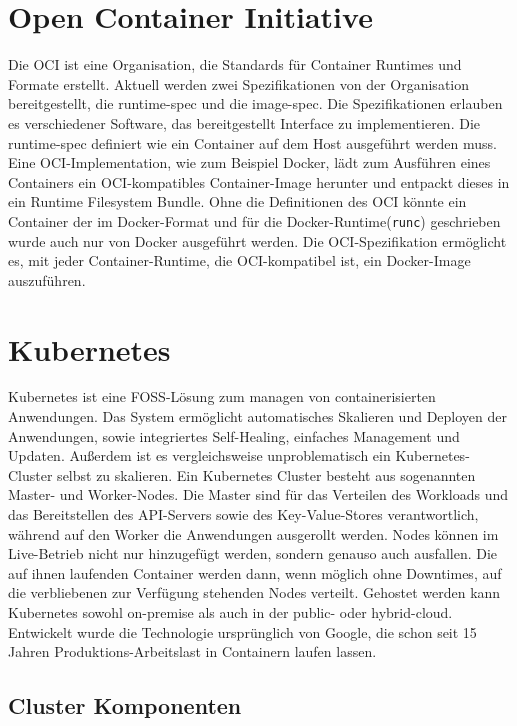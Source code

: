 \section{Open Container Initiative}
Die \ac{OCI} ist eine Organisation, die Standards für Container Runtimes und Formate erstellt.
Aktuell werden zwei Spezifikationen von der Organisation bereitgestellt, die \ac{runtime-spec} und die \ac{image-spec}.
Die Spezifikationen erlauben es verschiedener Software, das bereitgestellt Interface zu implementieren.
Die \ac{runtime-spec} definiert wie ein Container auf dem Host ausgeführt werden muss. 
Eine \ac{OCI}-Implementation, wie zum Beispiel Docker, lädt zum Ausführen eines Containers ein \ac{OCI}-kompatibles Container-Image herunter und entpackt dieses in ein Runtime Filesystem Bundle.
Ohne die Definitionen des \ac{OCI} könnte ein Container der im Docker-Format und für die Docker-Runtime(\texttt{runc}) geschrieben wurde auch nur von Docker ausgeführt werden.
Die \ac{OCI}-Spezifikation ermöglicht es, mit jeder Container-Runtime, die \ac{OCI}-kompatibel ist, ein Docker-Image auszuführen. \cite{oci}



\section{Kubernetes}
Kubernetes ist eine \ac{FOSS}-Lösung zum managen von containerisierten Anwendungen.
Das System ermöglicht automatisches Skalieren und Deployen der Anwendungen, sowie integriertes Self-Healing, einfaches Management und Updaten.
Außerdem ist es vergleichsweise unproblematisch ein Kubernetes-Cluster selbst zu skalieren. 
Ein Kubernetes Cluster besteht aus sogenannten Master- und Worker-Nodes. 
Die Master sind für das Verteilen des Workloads und das Bereitstellen des \ac{API}-Servers sowie des Key-Value-Stores verantwortlich, während auf den Worker die Anwendungen ausgerollt werden. 
Nodes können im Live-Betrieb nicht nur hinzugefügt werden, sondern genauso auch ausfallen. 
Die auf ihnen laufenden Container werden dann, wenn möglich ohne Downtimes, auf die verbliebenen zur Verfügung stehenden Nodes verteilt. 
Gehostet werden kann Kubernetes sowohl on-premise als auch in der public- oder hybrid-cloud.
\\
Entwickelt wurde die Technologie ursprünglich von Google, die schon seit 15 Jahren Produktions-Arbeitslast in Containern laufen lassen.
\cite{kubernetes}

\subsection{Cluster Komponenten}

